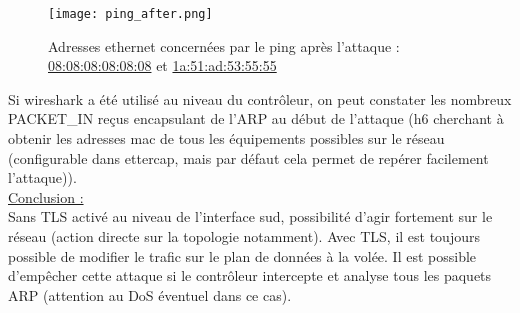 \begin{figure}[h]
  	\centering
  	\texttt{[image: ping\_after.png]}
  	\caption{Adresses ethernet concernées par le ping après l'attaque : \url{08:08:08:08:08:08} et \url{1a:51:ad:53:55:55}}
\end{figure}

Si wireshark a été utilisé au niveau du contrôleur, on peut constater les nombreux PACKET\_IN reçus encapsulant de l'ARP au début de l'attaque (h6 cherchant à obtenir les adresses mac de tous les équipements possibles sur le réseau (configurable dans ettercap, mais par défaut cela permet de repérer facilement l'attaque)).\\

\underline{Conclusion :}\\
Sans TLS activé au niveau de l'interface sud, possibilité d'agir fortement sur le réseau (action directe sur la topologie notamment). Avec TLS, il est toujours possible de modifier le trafic sur le plan de données à la volée. Il est possible d'empêcher cette attaque si le contrôleur intercepte et analyse tous les paquets ARP (attention au DoS éventuel dans ce cas).